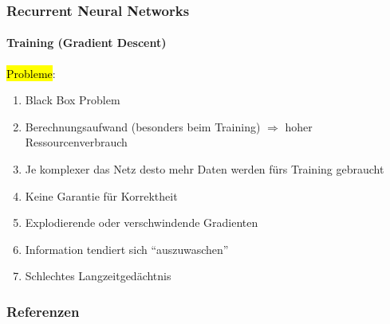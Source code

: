 \documentclass[german,aspectratio=169]{beamer}
\begin{document}
\begin{frame}
	\frametitle{Recurrent Neural Networks}
	\framesubtitle{Training (Gradient Descent)}
	\hl{Probleme}:
	\begin{enumerate}[label=$\bullet$]
		\item Black Box Problem
		\item Berechnungsaufwand (besonders beim Training) $\Rightarrow$ hoher Ressourcenverbrauch
		\item Je komplexer das Netz desto mehr Daten werden fürs Training gebraucht
		\item Keine Garantie für Korrektheit
		\item Explodierende oder verschwindende Gradienten
		\item Information tendiert sich ``auszuwaschen''
		\item Schlechtes Langzeitgedächtnis
	\end{enumerate}
\end{frame}

%	


\begin{frame}[allowframebreaks]
	\frametitle{Referenzen}
	{\scriptsize%
		
		}
\end{frame}
\end{document}
